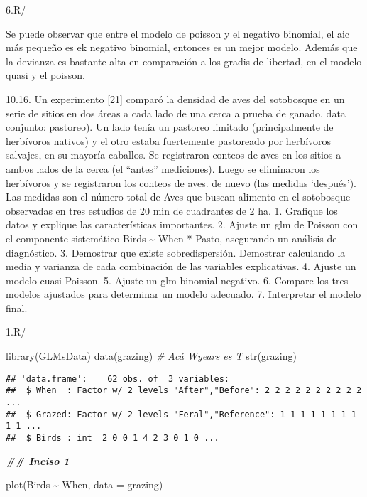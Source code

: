 \documentclass[
]{article}
\newenvironment{Shaded}{\begin{snugshade}}{\end{snugshade}}
\newcommand{\AttributeTok}[1]{\textcolor[rgb]{0.77,0.63,0.00}{#1}}
\newcommand{\CommentTok}[1]{\textcolor[rgb]{0.56,0.35,0.01}{\textit{#1}}}
\newcommand{\DocumentationTok}[1]{\textcolor[rgb]{0.56,0.35,0.01}{\textbf{\textit{#1}}}}
\newcommand{\FunctionTok}[1]{\textcolor[rgb]{0.00,0.00,0.00}{#1}}
\newcommand{\NormalTok}[1]{#1}
\newcommand{\SpecialCharTok}[1]{\textcolor[rgb]{0.00,0.00,0.00}{#1}}
\begin{document}
6.R/

Se puede observar que entre el modelo de poisson y el negativo binomial,
el aic más pequeño es ek negativo binomial, entonces es un mejor modelo.
Además que la devianza es bastante alta en comparación a los gradis de
libertad, en el modelo quasi y el poisson.

10.16. Un experimento {[}21{]} comparó la densidad de aves del
sotobosque en un serie de sitios en dos áreas a cada lado de una cerca a
prueba de ganado, data conjunto: pastoreo). Un lado tenía un pastoreo
limitado (principalmente de herbívoros nativos) y el otro estaba
fuertemente pastoreado por herbívoros salvajes, en su mayoría caballos.
Se registraron conteos de aves en los sitios a ambos lados de la cerca
(el ``antes'' mediciones). Luego se eliminaron los herbívoros y se
registraron los conteos de aves. de nuevo (las medidas `después'). Las
medidas son el número total de Aves que buscan alimento en el sotobosque
observadas en tres estudios de 20 min de cuadrantes de 2 ha. 1. Grafique
los datos y explique las características importantes. 2. Ajuste un glm
de Poisson con el componente sistemático Birds \textasciitilde{} When *
Pasto, asegurando un análisis de diagnóstico. 3. Demostrar que existe
sobredispersión. Demostrar calculando la media y varianza de cada
combinación de las variables explicativas. 4. Ajuste un modelo
cuasi-Poisson. 5. Ajuste un glm binomial negativo. 6. Compare los tres
modelos ajustados para determinar un modelo adecuado. 7. Interpretar el
modelo final.

1.R/

\begin{Shaded}
\begin{Highlighting}[]
\FunctionTok{library}\NormalTok{(GLMsData)}
\FunctionTok{data}\NormalTok{(grazing)}
\CommentTok{\# Acá Wyears es T}
\FunctionTok{str}\NormalTok{(grazing)}
\end{Highlighting}
\end{Shaded}

\begin{verbatim}
## 'data.frame':    62 obs. of  3 variables:
##  $ When  : Factor w/ 2 levels "After","Before": 2 2 2 2 2 2 2 2 2 2 ...
##  $ Grazed: Factor w/ 2 levels "Feral","Reference": 1 1 1 1 1 1 1 1 1 1 ...
##  $ Birds : int  2 0 0 1 4 2 3 0 1 0 ...
\end{verbatim}

\begin{Shaded}
\begin{Highlighting}[]
\DocumentationTok{\#\# Inciso 1}

\FunctionTok{plot}\NormalTok{(Birds }\SpecialCharTok{\textasciitilde{}}\NormalTok{ When, }\AttributeTok{data =}\NormalTok{ grazing)}
\end{Highlighting}
\end{Shaded}
\end{document}

